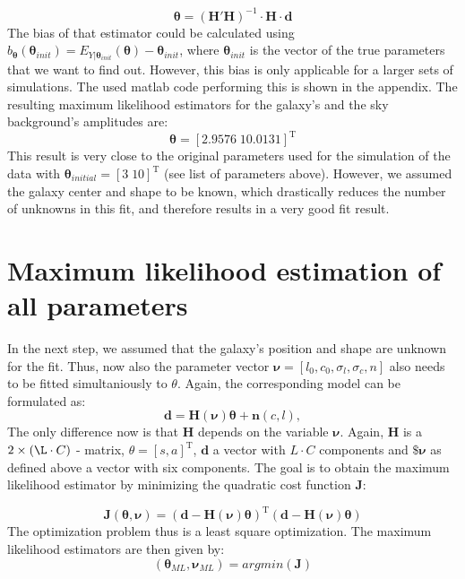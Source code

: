 \begin{equation}
\boldsymbol{\theta}=\left(\boldsymbol{H'H}\right)^{-1}\cdot\boldsymbol{H}\cdot\boldsymbol{d}
\end{equation}
The bias of that estimator could be calculated using $b_{\boldsymbol{\theta}}(\boldsymbol{\theta}_{init})=E_{Y|\boldsymbol{\theta}_{init}}(\boldsymbol{\theta})-\boldsymbol{\theta}_{init}$, where $\boldsymbol{\theta}_{init}$ is the vector of the true parameters that we want to find out. However, this bias is only applicable for a larger sets of simulations.
The used matlab code performing this is shown in the appendix. The resulting maximum likelihood estimators for the galaxy's and the sky background's amplitudes are:
\begin{equation*}
\boldsymbol{\theta}=\left[2.9576\;10.0131 \right]^{\mathrm{T}}
\end{equation*}
This result is very close to the original parameters used for the simulation of the data with $ \boldsymbol{\theta}_{initial}=\left[3\;10 \right]^{\mathrm{T}}$ (see list of parameters above). However, we assumed the galaxy center and shape to be known, which drastically reduces the number of unknowns in this fit, and therefore results in a very good fit result.

\section{Maximum likelihood estimation of all parameters}
In the next step, we assumed that the galaxy's position and shape are unknown for the fit. Thus, now also the parameter vector $\boldsymbol{\nu}=\left[l_{0},c_{0}, \sigma_{l}, \sigma_{c},n\right]$ also needs to be fitted simultaniously to $\theta$. Again, the corresponding model can be formulated as:
\begin{equation*}
\boldsymbol{d}=\boldsymbol{H}(\boldsymbol{\nu})\boldsymbol{\theta}+\boldsymbol{n}(c,l),
\end{equation*}
The only difference now is that $\boldsymbol{H}$ depends on the variable $\boldsymbol{\nu}$. Again, $\boldsymbol{H}$ is a $2\times(\L\cdot C)$ - matrix, $\theta=\left[s,a\right]^{\mathrm{T}}$, $\boldsymbol{d}$ a vector with $L\cdot C$ components and $\$\boldsymbol{\nu}$ as defined above a vector with six components. The goal is to obtain the maximum likelihood estimator by minimizing the quadratic cost function $\boldsymbol{J}$:

\begin{equation}
\boldsymbol{J}(\boldsymbol{\theta,\nu})=\left(\boldsymbol{d}-\boldsymbol{H}(\boldsymbol{\nu})\boldsymbol{\theta}\right)^{\mathrm{T}}\left(\boldsymbol{d}-\boldsymbol{H}(\boldsymbol{\nu})\boldsymbol{\theta}\right)
\label{eq:costfunction}
\end{equation}
The optimization problem thus is a least square optimization. The maximum likelihood estimators are then given by:
\begin{equation*}
\left(\boldsymbol{\theta}_{ML},\boldsymbol{\nu}_{ML}\right)=argmin\left(\boldsymbol{J}\right)
\end{equation*}

